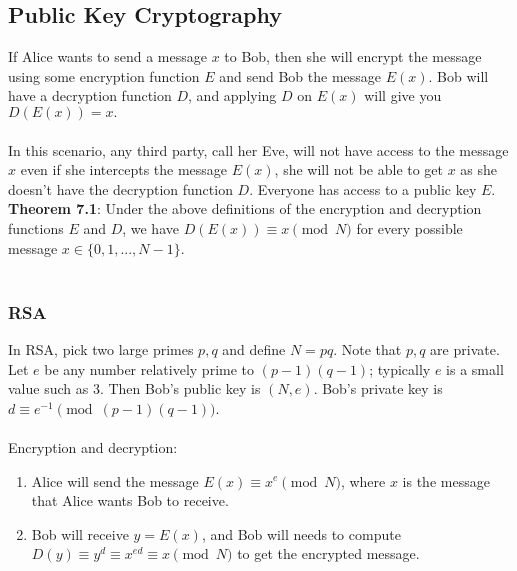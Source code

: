 \documentclass{article}
\theoremstyle{definition}
\begin{document}
\subsection*{Public Key Cryptography}
If Alice wants to send a message $x$ to Bob, then she will encrypt the message using some encryption function $E$ and send Bob the message $E(x)$. Bob will have a decryption function $D$, and applying $D$ on $E(x)$ will give you $D(E(x)) = x.$ \\ \\
In this scenario, any third party, call her Eve, will not have access to the message $x$ even if she intercepts the message $E(x)$, she will not be able to get $x$ as she doesn't have the decryption function $D$. Everyone has access to a public key $E$.
\textbf{Theorem 7.1}: Under the above definitions of the encryption and decryption functions $E$ and $D$, we have $D(E(x)) \equiv x \pmod{N}$ for every possible message $x \in \{0,1,...,N - 1\}$. \\ \\
\subsubsection*{RSA}
In RSA, pick two large primes $p, q$ and define $N = pq$. Note that $p, q$ are private. Let $e$ be any number relatively prime to $(p - 1)(q - 1)$; typically $e$ is a small value such as 3. Then Bob's public key is $(N, e)$. Bob's private key is $d \equiv e^{-1} \pmod{(p - 1)(q - 1)}$. \\ \\
Encryption and decryption: \begin{enumerate}
    \item Alice will send the message $E(x) \equiv x^e \pmod{N}$, where $x$ is the message that Alice wants Bob to receive.
    \item Bob will receive $y = E(x)$, and Bob will needs to compute $D(y) \equiv y^d \equiv x^{ed} \equiv x \pmod{N}$ to get the encrypted message.
\end{enumerate}
\end{document}
